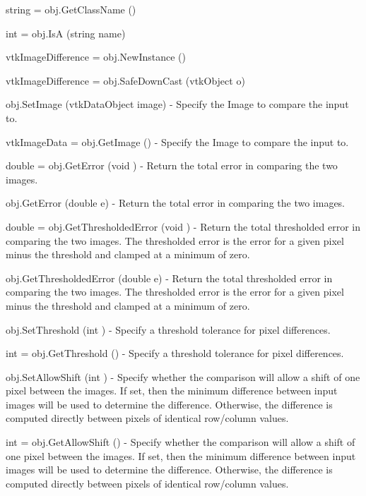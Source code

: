 \begin{DoxyItemize}
\item {\ttfamily string = obj.\-Get\-Class\-Name ()}  
\item {\ttfamily int = obj.\-Is\-A (string name)}  
\item {\ttfamily vtk\-Image\-Difference = obj.\-New\-Instance ()}  
\item {\ttfamily vtk\-Image\-Difference = obj.\-Safe\-Down\-Cast (vtk\-Object o)}  
\item {\ttfamily obj.\-Set\-Image (vtk\-Data\-Object image)} -\/ Specify the Image to compare the input to.  
\item {\ttfamily vtk\-Image\-Data = obj.\-Get\-Image ()} -\/ Specify the Image to compare the input to.  
\item {\ttfamily double = obj.\-Get\-Error (void )} -\/ Return the total error in comparing the two images.  
\item {\ttfamily obj.\-Get\-Error (double e)} -\/ Return the total error in comparing the two images.  
\item {\ttfamily double = obj.\-Get\-Thresholded\-Error (void )} -\/ Return the total thresholded error in comparing the two images. The thresholded error is the error for a given pixel minus the threshold and clamped at a minimum of zero.  
\item {\ttfamily obj.\-Get\-Thresholded\-Error (double e)} -\/ Return the total thresholded error in comparing the two images. The thresholded error is the error for a given pixel minus the threshold and clamped at a minimum of zero.  
\item {\ttfamily obj.\-Set\-Threshold (int )} -\/ Specify a threshold tolerance for pixel differences.  
\item {\ttfamily int = obj.\-Get\-Threshold ()} -\/ Specify a threshold tolerance for pixel differences.  
\item {\ttfamily obj.\-Set\-Allow\-Shift (int )} -\/ Specify whether the comparison will allow a shift of one pixel between the images. If set, then the minimum difference between input images will be used to determine the difference. Otherwise, the difference is computed directly between pixels of identical row/column values.  
\item {\ttfamily int = obj.\-Get\-Allow\-Shift ()} -\/ Specify whether the comparison will allow a shift of one pixel between the images. If set, then the minimum difference between input images will be used to determine the difference. Otherwise, the difference is computed directly between pixels of identical row/column values.  

\end{DoxyItemize}
